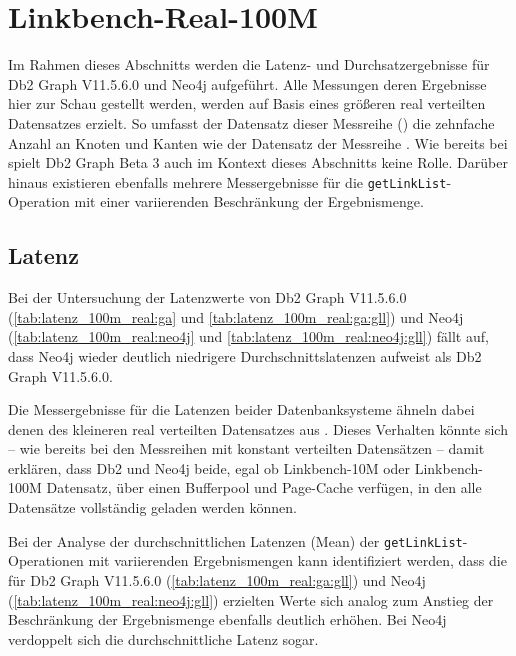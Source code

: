 \section{Linkbench-Real-100M}
\label{ergebnisse:100m_real}
Im Rahmen dieses Abschnitts werden die Latenz- und Durchsatzergebnisse für Db2 Graph V11.5.6.0 und Neo4j aufgeführt. Alle Messungen deren Ergebnisse hier zur Schau gestellt werden, werden auf Basis eines größeren real verteilten Datensatzes erzielt. So umfasst der Datensatz dieser Messreihe () die zehnfache Anzahl an Knoten und Kanten wie der Datensatz der Messreihe . Wie bereits bei  spielt Db2 Graph Beta 3 auch im Kontext dieses Abschnitts keine Rolle. Darüber hinaus existieren ebenfalls mehrere Messergebnisse für die \texttt{getLinkList}-Ope\-ra\-ti\-on mit einer variierenden Beschränkung der Ergebnismenge.

\subsection{Latenz}
Bei der Untersuchung der Latenzwerte von Db2 Graph V11.5.6.0 (\autoref{tab:latenz_100m_real:ga} und \autoref{tab:latenz_100m_real:ga:gll}) und Neo4j (\autoref{tab:latenz_100m_real:neo4j} und \autoref{tab:latenz_100m_real:neo4j:gll}) fällt auf, dass Neo4j wieder deutlich niedrigere Durchschnittslatenzen aufweist als Db2 Graph V11.5.6.0. 

Die Messergebnisse für die Latenzen beider Datenbanksysteme ähneln dabei denen des kleineren real verteilten Datensatzes aus . Dieses Verhalten könnte sich -- wie bereits bei den Messreihen mit konstant verteilten Datensätzen -- damit erklären, dass Db2 und Neo4j beide, egal ob Linkbench-10M oder Linkbench-100M Datensatz, über einen Bufferpool und Page-Cache verfügen, in den alle Datensätze vollständig geladen werden können.

Bei der Analyse der durchschnittlichen Latenzen (Mean) der \texttt{getLinkList}-Ope\-ra\-ti\-on\-en mit variierenden Ergebnismengen kann identifiziert werden, dass die für Db2 Graph V11.5.6.0 (\autoref{tab:latenz_100m_real:ga:gll}) und Neo4j (\autoref{tab:latenz_100m_real:neo4j:gll}) erzielten Werte sich analog zum Anstieg der Beschränkung der Ergebnismenge ebenfalls deutlich erhöhen. Bei Neo4j verdoppelt sich die durchschnittliche Latenz sogar. 

